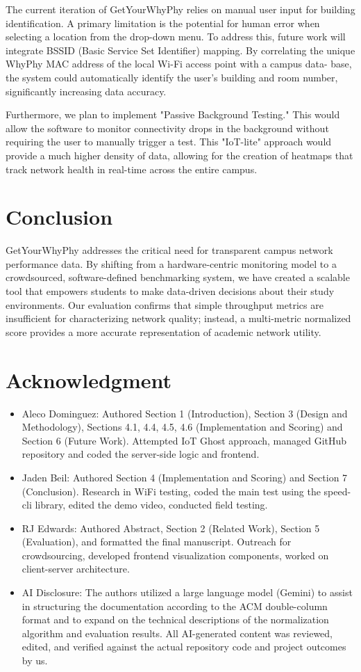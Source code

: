 \documentclass[sigconf]{acmart}
\begin{document}
The current iteration of GetYourWhyPhy relies on manual user input for building identification. A primary limitation is the potential for human error when selecting a location from the drop-down menu. To address this, future work will integrate BSSID (Basic Service Set Identifier) mapping. By correlating the unique WhyPhy MAC address of the local Wi-Fi access point with a campus data- base, the system could automatically identify the user’s building and room number, significantly increasing data accuracy.

Furthermore, we plan to implement "Passive Background Testing." This would allow the software to monitor connectivity drops in the background without requiring the user to manually trigger a test. This "IoT-lite" approach would provide a much higher density of data, allowing for the creation of heatmaps that track network health in real-time across the entire campus.

\section{Conclusion}
GetYourWhyPhy addresses the critical need for transparent campus network performance data. By shifting from a hardware-centric monitoring model to a crowdsourced, software-defined benchmarking system, we have created a scalable tool that empowers students to make data-driven decisions about their study environments. Our evaluation confirms that simple throughput metrics are insufficient for characterizing network quality; instead, a multi-metric normalized score provides a more accurate representation of academic network utility.

\section{Acknowledgment}
\begin{itemize}
\item {\texttt{}}Aleco Dominguez: Authored Section 1 (Introduction), Section 3 (Design and Methodology), Sections 4.1, 4.4, 4.5, 4.6 (Implementation and Scoring) and Section 6 (Future Work). Attempted IoT Ghost approach, managed GitHub repository and coded the server-side logic and frontend.
\item {\texttt{}}Jaden Beil: Authored Section 4 (Implementation and Scoring) and Section 7 (Conclusion). Research in WiFi testing, coded the main test using the speed-cli library, edited the demo video, conducted field testing.
\item {\texttt{}}RJ Edwards: Authored Abstract, Section 2 (Related Work), Section 5 (Evaluation), and formatted the final manuscript. Outreach for crowdsourcing, developed frontend visualization components, worked on client-server architecture.
\item {\texttt{}}AI Disclosure: The authors utilized a large language model (Gemini) to assist in structuring the documentation according to the ACM double-column format and to expand on the technical descriptions of the normalization algorithm and evaluation results. All AI-generated content was reviewed, edited, and verified against the actual repository code and project outcomes by us.
\end{itemize}


\nocite{*}


\end{document}
